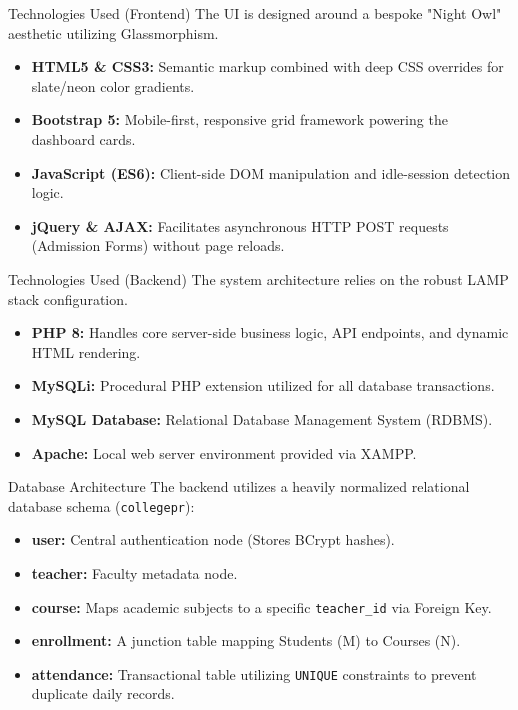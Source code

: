 \documentclass[11pt, aspectratio=169]{beamer}
\begin{document}
\begin{frame}{Technologies Used (Frontend)}
    The UI is designed around a bespoke "Night Owl" aesthetic utilizing Glassmorphism.
    \vspace{0.3cm}
    \begin{itemize}
        \item \textbf{HTML5 \& CSS3:} Semantic markup combined with deep CSS overrides for slate/neon color gradients.
        \item \textbf{Bootstrap 5:} Mobile-first, responsive grid framework powering the dashboard cards.
        \item \textbf{JavaScript (ES6):} Client-side DOM manipulation and idle-session detection logic.
        \item \textbf{jQuery \& AJAX:} Facilitates asynchronous HTTP POST requests (Admission Forms) without page reloads.
    \end{itemize}
\end{frame}

\begin{frame}{Technologies Used (Backend)}
    The system architecture relies on the robust LAMP stack configuration.
    \vspace{0.3cm}
    \begin{itemize}
        \item \textbf{PHP 8:} Handles core server-side business logic, API endpoints, and dynamic HTML rendering.
        \item \textbf{MySQLi:} Procedural PHP extension utilized for all database transactions.
        \item \textbf{MySQL Database:} Relational Database Management System (RDBMS).
        \item \textbf{Apache:} Local web server environment provided via XAMPP.
    \end{itemize}
\end{frame}

\begin{frame}{Database Architecture}
    The backend utilizes a heavily normalized relational database schema (\texttt{collegepr}):
    \vspace{0.3cm}
    \begin{itemize}
        \item \textbf{user:} Central authentication node (Stores BCrypt hashes).
        \item \textbf{teacher:} Faculty metadata node.
        \item \textbf{course:} Maps academic subjects to a specific \texttt{teacher\_id} via Foreign Key.
        \item \textbf{enrollment:} A junction table mapping Students (M) to Courses (N).
        \item \textbf{attendance:} Transactional table utilizing \texttt{UNIQUE} constraints to prevent duplicate daily records.
    \end{itemize}
\end{frame}
\end{document}
